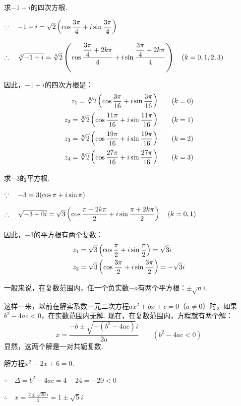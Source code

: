 \begin{example}
    求$-1+i$的四次方根.
\end{example}

\begin{solution}
$\because\quad -1+i=\sqrt{2}\left(\cos{\dfrac{3\pi}{4}}+i\sin{\dfrac{3\pi}{4}}\right)$

$\therefore\quad \sqrt[4]{-1+i}=\sqrt[8]{2}\left(\cos{\dfrac{\dfrac{3\pi}{4}+2k\pi}{4}}+i\sin{\dfrac{\dfrac{3\pi}{4}+2k\pi}{4}}\right)\quad (k=0,1,2,3)$

因此，$-1+i$的四次方根是：
\[\begin{split}
z_1=\sqrt[8]{2}\left(\cos{\dfrac{3\pi}{16}}+i\sin{\dfrac{3\pi}{16}}\right)\qquad & (k=0)\\
z_2=\sqrt[8]{2}\left(\cos{\dfrac{11\pi}{16}}+i\sin{\dfrac{11\pi}{16}}\right)\qquad & (k=1)\\
z_3=\sqrt[8]{2}\left(\cos{\dfrac{19\pi}{16}}+i\sin{\dfrac{19\pi}{16}}\right)\qquad & (k=2)\\
z_4=\sqrt[8]{2}\left(\cos{\dfrac{27\pi}{16}}+i\sin{\dfrac{27\pi}{16}}\right)\qquad & (k=3)\\
\end{split}\]
\end{solution}

\begin{example}
    求$-3$的平方根.
\end{example}

\begin{solution}
$\because\quad -3=3(\cos{\pi}+i\sin{\pi})$

$\therefore\quad \sqrt{-3+0i}=\sqrt{3}\left(\cos{\dfrac{\pi+2k\pi}{2}}+i\sin{\dfrac{\pi+2k\pi}{2}}\right)\quad (k=0,1)$

因此，$-3$的平方根有两个复数：
\[\begin{split}
z_1&=\sqrt{3}\left(\cos{\dfrac{\pi}{2}}+i\sin{\dfrac{\pi}{2}}\right)=\sqrt{3}i\\
z_2&=\sqrt{3}\left(\cos{\dfrac{3\pi}{2}}+i\sin{\dfrac{3\pi}{2}}\right)=-\sqrt{3}i\\
\end{split}\]
\end{solution}

一般来说，在复数范围内，任一个负实数$-a$有两个平方根：$\pm\sqrt{a}i$.

这样一来，以前在解实系数一元二次方程$ax^2+bx+c=0$（$a\ne 0$）时，如果$b^2-4ac<0$，在实数范围内无解. 现在，在复数范围内，方程就有两个解：
\[x=\frac{-b\pm\sqrt{-(b^2-4ac)}i}{2a}\qquad (b^2-4ac<0)\]
显然，这两个解是一对共轭复数.

\begin{example}
    解方程$x^2-2x+6=0$.
\end{example}

\begin{solution}
$\because\quad \Delta=b^2-4ac=4-24=-20<0$

$\therefore\quad x=\frac{2\pm\sqrt{20}i}{2}=1\pm\sqrt{5}i$
\end{solution}


